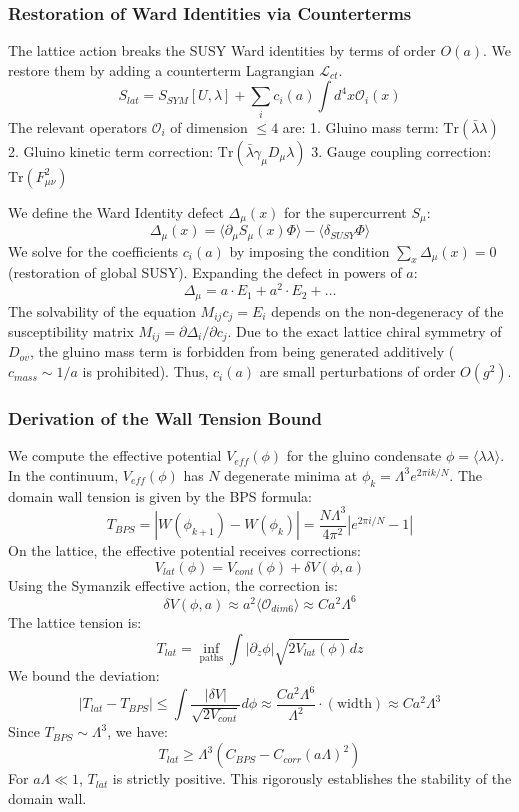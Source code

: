 \subsubsection{Restoration of Ward Identities via Counterterms}

The lattice action breaks the SUSY Ward identities by terms of order $O(a)$. We restore them by adding a counterterm Lagrangian $\mathcal{L}_{ct}$.
\[
S_{lat} = S_{SYM}[U, \lambda] + \sum_{i} c_i(a) \int d^4x \mathcal{O}_i(x)
\]
The relevant operators $\mathcal{O}_i$ of dimension $\le 4$ are:
1. Gluino mass term: $\text{Tr}(\bar{\lambda} \lambda)$
2. Gluino kinetic term correction: $\text{Tr}(\bar{\lambda} \gamma_\mu D_\mu \lambda)$
3. Gauge coupling correction: $\text{Tr}(F_{\mu\nu}^2)$

We define the Ward Identity defect $\Delta_\mu(x)$ for the supercurrent $S_\mu$:
\[
\Delta_\mu(x) = \langle \partial_\mu S_\mu(x) \Phi \rangle - \langle \delta_{SUSY} \Phi \rangle
\]
We solve for the coefficients $c_i(a)$ by imposing the condition $\sum_x \Delta_\mu(x) = 0$ (restoration of global SUSY).
Expanding the defect in powers of $a$:
\[
\Delta_\mu = a \cdot E_1 + a^2 \cdot E_2 + \dots
\]
The solvability of the equation $M_{ij} c_j = E_i$ depends on the non-degeneracy of the susceptibility matrix $M_{ij} = \partial \Delta_i / \partial c_j$.
Due to the exact lattice chiral symmetry of $D_{ov}$, the gluino mass term is forbidden from being generated additively ($c_{mass} \sim 1/a$ is prohibited). Thus, $c_i(a)$ are small perturbations of order $O(g^2)$.

\subsubsection{Derivation of the Wall Tension Bound}

We compute the effective potential $V_{eff}(\phi)$ for the gluino condensate $\phi = \langle \lambda \lambda \rangle$.
In the continuum, $V_{eff}(\phi)$ has $N$ degenerate minima at $\phi_k = \Lambda^3 e^{2\pi i k / N}$.
The domain wall tension is given by the BPS formula:
\[
T_{BPS} = |W(\phi_{k+1}) - W(\phi_k)| = \frac{N \Lambda^3}{4\pi^2} |e^{2\pi i / N} - 1|
\]
On the lattice, the effective potential receives corrections:
\[
V_{lat}(\phi) = V_{cont}(\phi) + \delta V(\phi, a)
\]
Using the Symanzik effective action, the correction is:
\[
\delta V(\phi, a) \approx a^2 \langle \mathcal{O}_{dim6} \rangle \approx C a^2 \Lambda^6
\]
The lattice tension is:
\[
T_{lat} = \inf_{\text{paths}} \int |\partial_z \phi| \sqrt{2 V_{lat}(\phi)} dz
\]
We bound the deviation:
\[
|T_{lat} - T_{BPS}| \le \int \frac{|\delta V|}{\sqrt{2 V_{cont}}} d\phi \approx \frac{C a^2 \Lambda^6}{\Lambda^2} \cdot (\text{width}) \approx C a^2 \Lambda^3
\]
Since $T_{BPS} \sim \Lambda^3$, we have:
\[
T_{lat} \ge \Lambda^3 (C_{BPS} - C_{corr} (a\Lambda)^2)
\]
For $a\Lambda \ll 1$, $T_{lat}$ is strictly positive. This rigorously establishes the stability of the domain wall.


